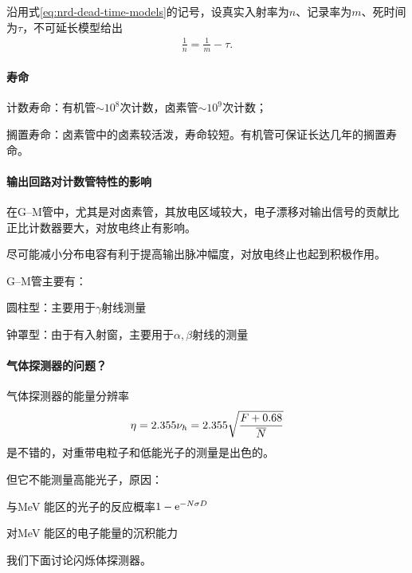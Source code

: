 沿用式\eqref{eq:nrd-dead-time-models}的记号，设真实入射率为$n$、记录率为$m$、死时间为$\tau$，不可延长模型给出
\begin{align}
	\frac1n = \frac1m - \tau.
\end{align}
\paragraph{寿命}计数寿命：有机管$\sim 10^8$次计数，卤素管$\sim 10^9$次计数；

搁置寿命：卤素管中的卤素较活泼，寿命较短。有机管可保证长达几年的搁置寿命。
\paragraph{输出回路对计数管特性的影响}
在G--M管中，尤其是对卤素管，其放电区域较大，电子漂移对输出信号的贡献比正比计数器要大，对放电终止有影响。

尽可能减小分布电容有利于提高输出脉冲幅度，对放电终止也起到积极作用。


G--M管主要有：
\begin{compactenum}
	\item 圆柱型：主要用于$\gamma$射线测量
	\item 钟罩型：由于有入射窗，主要用于$\alpha,\beta$射线的测量
\end{compactenum}

\paragraph{气体探测器的问题？}气体探测器的能量分辨率
\[
	\eta = 2.355\nu_h = 2.355\sqrt{\frac{F + 0.68}{\overline{N}}}
\]
是不错的，对重带电粒子和低能光子的测量是出色的。

但它不能测量高能光子，原因：
\begin{compactenum}
	\item 与\unit{MeV} 能区的光子的反应概率$1 - \mathop{}\!\mathrm{e}^{-N\sigma D}$
	\item 对\unit{MeV} 能区的电子能量的沉积能力
\end{compactenum}
我们下面讨论闪烁体探测器。

